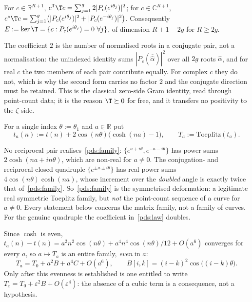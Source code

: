 \begin{proposition}\label{pds:gram}
For $c\in\mathbb{R}^{R+1}$,
$c^{\mathsf T}\T c=\sum_{j=1}^{g}2|P_c(e^{i\theta_j})|^{2}$; for $c\in\mathbb{C}^{R+1}$,
$c^{*}\T c=\sum_{j=1}^{g}\bigl(|P_c(e^{i\theta_j})|^{2}+|P_c(e^{-i\theta_j})|^{2}\bigr)$.
Consequently $E:=\ker\T=\{c:P_c(e^{i\theta_j})=0\ \forall j\}$, of dimension $R+1-2g$ for
$R\ge2g$.
\end{proposition}

The coefficient $2$ is the number of normalised roots in a conjugate pair, not a
normalisation: the unindexed identity sums $|P_c(\overline{\hat\alpha})|^{2}$ over all $2g$
roots $\hat\alpha$, and for real $c$ the two members of each pair contribute equally. For
complex $c$ they do not, which is why the second form carries no factor $2$ and the
conjugate direction must be retained. This is the classical zero-side Gram identity, read
through point-count data; it is the reason $\T\succeq0$ for free, and it transfers no
positivity to the $\zeta$ side.

For a single index $\theta:=\theta_1$ and $a\in\mathbb{R}$ put
\begin{equation}\label{pds:family}
t_a(n):=t(n)+2\cos(n\theta)\bigl(\cosh(na)-1\bigr),\qquad T_a:=\mathrm{Toeplitz}(t_a).
\end{equation}

\begin{remark}\label{pds:realiz}
No reciprocal pair realises~\eqref{pds:family}: $\{e^{a+i\theta},e^{-a-i\theta}\}$ has power
sums $2\cosh(na+in\theta)$, which are non-real for $a\ne0$. The conjugation- and
reciprocal-closed quadruple $\{e^{\pm a\pm i\theta}\}$ has real power sums
$4\cos(n\theta)\cosh(na)$, whose increment over the \emph{doubled} angle is exactly twice
that of~\eqref{pds:family}. So~\eqref{pds:family} is the symmetrised deformation: a
legitimate real symmetric Toeplitz family, but \emph{not} the point-count sequence of a
curve for $a\ne0$. Every statement below concerns the matrix family, not a family of
curves. For the genuine quadruple the coefficient in~\eqref{pds:law} doubles.
\end{remark}

Since $\cosh$ is even, $t_a(n)-t(n)=a^{2}n^{2}\cos(n\theta)+a^{4}n^{4}\cos(n\theta)/12+O(a^{6})$
converges for every $a$, so $a\mapsto T_a$ is an entire family, \emph{even} in $a$:
\begin{equation}\label{pds:expand}
T_a=T_0+a^{2}B+a^{4}C+O(a^{6}),\qquad
B[i,k]=(i-k)^{2}\cos\bigl((i-k)\theta\bigr).
\end{equation}
Only after this evenness is established is one entitled to write
$T_\varepsilon=T_0+\varepsilon^{2}B+O(\varepsilon^{4})$: the absence of a cubic term is a
consequence, not a hypothesis.


